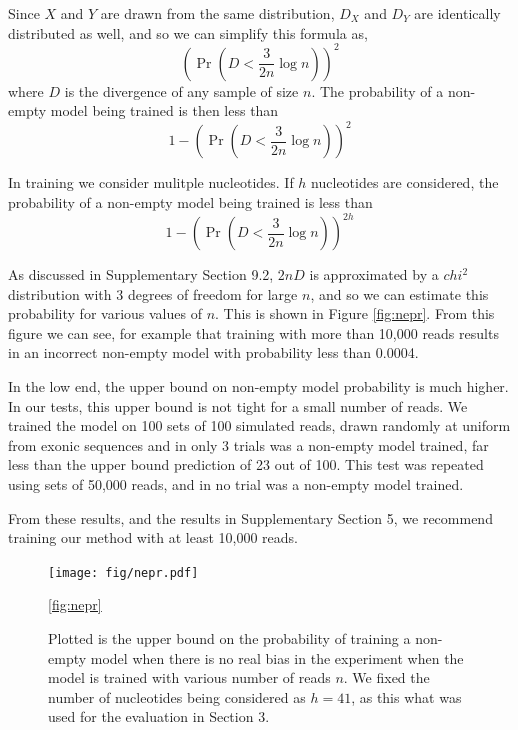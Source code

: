 \documentclass[letterpaper]{article}
\begin{document}
Since $X$ and $Y$ are drawn from the same distribution, $D_{X}$ and $D_{Y}$ are
identically distributed as well, and so we can simplify this formula as,
$$ (\Pr(D < \frac{3}{2n} \log n))^2 $$
where $D$ is the divergence of any sample of size $n$. The probability of a
non-empty model being trained is then less than
$$ 1 - (\Pr(D < \frac{3}{2n} \log n))^2 $$

In training we consider mulitple nucleotides. If $h$ nucleotides are considered,
the probability of a non-empty model being trained is less than
$$ 1 - (\Pr(D < \frac{3}{2n} \log n))^{2h} $$

As discussed in Supplementary Section 9.2, $2n D$ is approximated by a $chi^2$
distribution with 3 degrees of freedom for large $n$, and so we can estimate
this probability for various values of $n$. This is shown in Figure
\ref{fig:nepr}. From this figure we can see, for example that training with more
than 10,000 reads results in an incorrect non-empty model with probability less
than 0.0004.

In the low end, the upper bound on non-empty model probability is much higher.
In our tests, this upper bound is not tight for a small number of reads. We
trained the model on 100 sets of 100 simulated reads, drawn randomly at uniform
from exonic sequences and in only 3 trials was a non-empty model trained, far
less than the upper bound prediction of 23 out of 100. This test was repeated
using sets of 50,000 reads, and in no trial was a non-empty model trained.

From these results, and the results in Supplementary Section 5, we recommend
training our method with at least 10,000 reads.


\begin{figure}[H]
\centerline{
\texttt{[image: fig/nepr.pdf]}}
\caption{Plotted is the upper bound on the probability of training a non-empty
model when there is no real bias in the experiment when the model is trained
with various number of reads $n$. We fixed the number of nucleotides being
considered as $h = 41$, as this what was used for the evaluation in Section 3.}
\ref{fig:nepr}
\end{figure}






\end{document}
